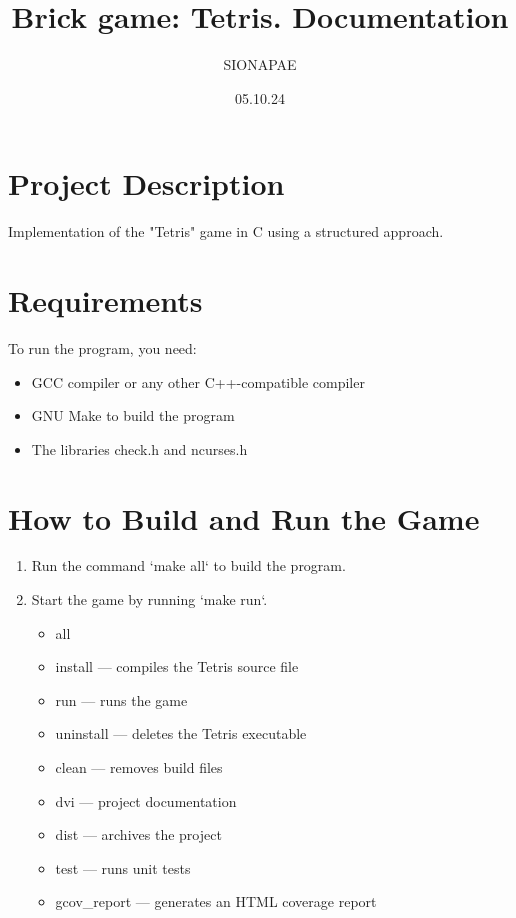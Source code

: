\documentclass{article}
\title{\Large Brick game: Tetris. Documentation}
\author{SIONAPAE}
\date{05.10.24}
\begin{document}
\maketitle

\begin{figure}[h]
\end{figure}
\section{Project Description}
Implementation of the "Tetris" game in C using a structured approach.

\section{Requirements}
To run the program, you need:
\begin{itemize}
    \item GCC compiler or any other C++-compatible compiler
    \item GNU Make to build the program
    \item The libraries check.h and ncurses.h
\end{itemize}

\section{How to Build and Run the Game}
\begin{enumerate}
    \item Run the command `make all` to build the program.
    \item Start the game by running `make run`.
    \begin{itemize}
        \item all  
        \item install — compiles the Tetris source file
        \item run — runs the game 
        \item uninstall — deletes the Tetris executable 
        \item clean — removes build files
        \item dvi — project documentation
        \item dist — archives the project 
        \item test — runs unit tests 
        \item gcov\_report — generates an HTML coverage report
    \end{itemize}
\end{enumerate}
\end{document}
